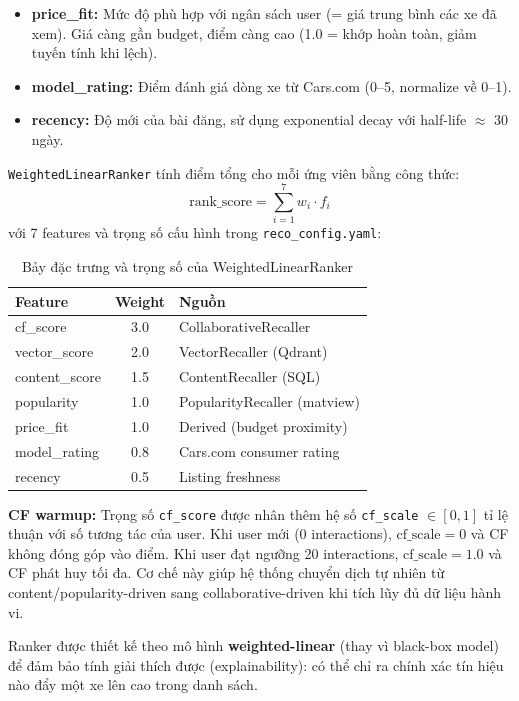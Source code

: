 \begin{itemize}
    \item \textbf{price\_fit:} Mức độ phù hợp với ngân sách user (= giá trung bình các xe đã xem). Giá càng gần budget, điểm càng cao (1.0 = khớp hoàn toàn, giảm tuyến tính khi lệch).
    \item \textbf{model\_rating:} Điểm đánh giá dòng xe từ Cars.com (0--5, normalize về 0--1).
    \item \textbf{recency:} Độ mới của bài đăng, sử dụng exponential decay với half-life $\approx$ 30 ngày.
\end{itemize}

\texttt{WeightedLinearRanker} tính điểm tổng cho mỗi ứng viên bằng công thức:
\[
\text{rank\_score} = \sum_{i=1}^{7} w_i \cdot f_i
\]
với 7 features và trọng số cấu hình trong \texttt{reco\_config.yaml}:

\begin{table}[H]
\centering
\small
\caption{Bảy đặc trưng và trọng số của WeightedLinearRanker}
\label{tab:ranker-features}
\begin{tabular}{|l|c|l|}
\hline
\textbf{Feature} & \textbf{Weight} & \textbf{Nguồn} \\
\hline
cf\_score & 3.0 & CollaborativeRecaller \\
\hline
vector\_score & 2.0 & VectorRecaller (Qdrant) \\
\hline
content\_score & 1.5 & ContentRecaller (SQL) \\
\hline
popularity & 1.0 & PopularityRecaller (matview) \\
\hline
price\_fit & 1.0 & Derived (budget proximity) \\
\hline
model\_rating & 0.8 & Cars.com consumer rating \\
\hline
recency & 0.5 & Listing freshness \\
\hline
\end{tabular}
\end{table}

\textbf{CF warmup:} Trọng số \texttt{cf\_score} được nhân thêm hệ số \texttt{cf\_scale} $\in [0, 1]$ tỉ lệ thuận với số tương tác của user. Khi user mới (0 interactions), $\text{cf\_scale} = 0$ và CF không đóng góp vào điểm. Khi user đạt ngưỡng 20 interactions, $\text{cf\_scale} = 1.0$ và CF phát huy tối đa. Cơ chế này giúp hệ thống chuyển dịch tự nhiên từ content/popularity-driven sang collaborative-driven khi tích lũy đủ dữ liệu hành vi.

Ranker được thiết kế theo mô hình \textbf{weighted-linear} (thay vì black-box model) để đảm bảo tính giải thích được (explainability): có thể chỉ ra chính xác tín hiệu nào đẩy một xe lên cao trong danh sách.

